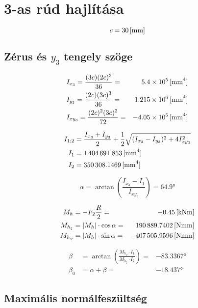 \section{3-as rúd hajlítása}

\begin{equation*}
	c = \siunit{30}{\mm}
\end{equation*}

\subsection{Zérus és $y_3$ tengely szöge}

\begin{align*}
	&I_{x_3} = \frac{(3c)(2c)^3}{36} = &\siunit{5.4e5}{\mm^4} \\
	&I_{y_3} = \frac{(2c)(3c)^3}{36} = &\siunit{1.215e6}{mm^4}\\
	&I_{xy_3} = \frac{(2c)^2(3c)^2}{72} = &\siunit{-4.05e5}{mm^4}
\end{align*}

\begin{align*}
	I_{1;2} &= \frac{I_{x_3} + I_{y_3}}{2} + \frac{1}{2}\sqrt{(I_{x_3} - I_{y_3})^2 +4I_{xy_3}^2} \\
	I_1 &= \siunit{1404691,853}{\mm^4} \\
	I_2 &= \siunit{350308.1469}{\mm^4}
\end{align*}

\begin{equation*}
	\alpha = \arctan\left(\frac{I_{x_3} - I_1}{I_{xy_3}}\right) = \ang{64.9}
\end{equation*}

\begin{align*}
	M_h &= - F_2 \frac{R}{2} = &\knm{-0.45} \\
	M_{h_\xi} &= \left|M_h\right|\cdot \cos\alpha = &\nmm{190889.7402} \\
	M_{h_\eta} &= \left|M_h\right|\cdot \sin\alpha = &\nmm{-407505.9596} \\
\end{align*}

\begin{align*}
	\beta &= \arctan\left(\frac{M_{h_\eta}\cdot I_1}{M_{h_\xi}\cdot I_2}\right) = &\ang{-83.3367} \\
	\beta_0 &= \alpha + \beta = &\ang{-18.437}
\end{align*}

\subsection{Maximális normálfeszültség}

